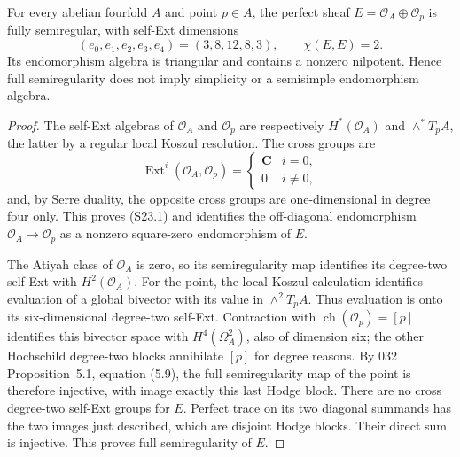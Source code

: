 \begin{proposition}
\label{prop:semireg-nonsimple-control}
For every abelian fourfold $A$ and point $p\in A$, the
perfect sheaf
$E=\mathcal O_A\oplus\mathcal O_p$ is fully semiregular,
with self-Ext dimensions
\[
 (e_0,e_1,e_2,e_3,e_4)=(3,8,12,8,3),
 \qquad \chi(E,E)=2.
 \tag{S23.1}
\]
Its endomorphism algebra is triangular and contains a
nonzero nilpotent. Hence full semiregularity does not
imply simplicity or a semisimple endomorphism algebra.
\end{proposition}
\begin{proof}
The self-Ext algebras of $\mathcal O_A$ and $\mathcal O_p$
are respectively $H^*(\mathcal O_A)$ and
$\wedge^*T_pA$, the latter by a regular local Koszul
resolution. The cross groups are
\[
 \operatorname{Ext}^i(\mathcal O_A,\mathcal O_p)=
 \begin{cases}\mathbf C&i=0,\\0&i\ne0,\end{cases}
\]
and, by Serre duality, the opposite cross groups are
one-dimensional in degree four only. This proves (S23.1)
and identifies the off-diagonal endomorphism
$\mathcal O_A\to\mathcal O_p$ as a nonzero square-zero
endomorphism of $E$.

The Atiyah class of $\mathcal O_A$ is zero, so its
semiregularity map identifies its degree-two self-Ext with
$H^2(\mathcal O_A)$. For the point, the local Koszul
calculation identifies evaluation of a global bivector
with its value in $\wedge^2T_pA$. Thus evaluation is onto
its six-dimensional degree-two self-Ext.
Contraction with $\operatorname{ch}(\mathcal O_p)=[p]$
identifies this bivector space with
$H^4(\Omega_A^2)$, also of dimension six; the other
Hochschild degree-two blocks annihilate $[p]$ for degree
reasons. By 032 Proposition~5.1, equation (5.9), the full
semiregularity map of the point is therefore injective,
with image exactly this last Hodge block.
There are no cross degree-two self-Ext groups for $E$.
Perfect trace on its two diagonal summands has the two
images just described, which are disjoint Hodge blocks.
Their direct sum is injective. This proves full
semiregularity of $E$.
\end{proof}

